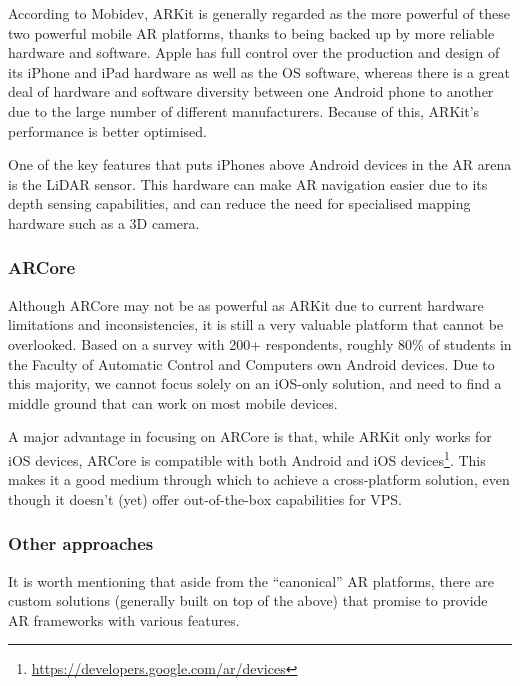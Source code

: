             According to Mobidev\cite{makarov2021arnavigation}, ARKit is generally regarded as the more powerful of these two powerful mobile AR platforms, thanks to being backed up by more reliable hardware and software. Apple has full control over the production and design of its iPhone and iPad hardware as well as the OS software, whereas there is a great deal of hardware and software diversity between one Android phone to another due to the large number of different manufacturers. Because of this, ARKit’s performance is better optimised.
            
            One of the key features that puts iPhones above Android devices in the AR arena is the LiDAR sensor. This hardware can make AR navigation easier due to its depth sensing capabilities, and can reduce the need for specialised mapping hardware such as a 3D camera.
            
            \subsubsection{ARCore} \label{2:arcore}

            Although ARCore may not be as powerful as ARKit due to current hardware limitations and inconsistencies, it is still a very valuable platform that cannot be overlooked. Based on a survey with 200+ respondents\cite{alexandru2020acsupbmobile}, roughly 80\% of students in the Faculty of Automatic Control and Computers own Android devices. Due to this majority, we cannot focus solely on an iOS-only solution, and need to find a middle ground that can work on most mobile devices.
            
            A major advantage in focusing on ARCore is that, while ARKit only works for iOS devices, ARCore is compatible with both Android and iOS devices\footnote{\url{https://developers.google.com/ar/devices}}. This makes it a good medium through which to achieve a cross-platform solution, even though it doesn’t (yet) offer out-of-the-box capabilities for VPS.
            
            \subsubsection{Other approaches} \label{2:other_ar_approaches}
            
            It is worth mentioning that aside from the “canonical” AR platforms, there are custom solutions (generally built on top of the above) that promise to provide AR frameworks with various features.
            
